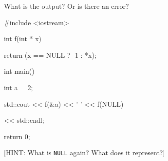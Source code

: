 What is the output? Or is there an error?



\begin{consolethree}[escapeinside=||]

#include <iostream>



int f(int * x)

{   

    return (x == NULL ? -1 : *x);

}



int main()

{

    int a = 2;

std::cout << f(&a) << ' ' << f(NULL)

          << std::endl;

    return 0;

}

\end{consolethree}

[HINT: What is \texttt{NULL} again? What does it represent?]

